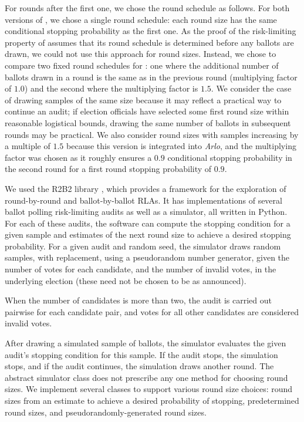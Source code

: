 For rounds after the first one, we chose the round schedule as follows. For both versions of \BRAVO, we chose a single round schedule: each round size has the same conditional stopping probability as the first one. As the proof of the risk-limiting property of \Minerva assumes that its round schedule is determined before any ballots are drawn, we could not use this approach for \Minerva round sizes. Instead, we chose to compare two fixed round schedules for \Minerva: one where the additional number of ballots drawn in a round is the same as in the previous round (multiplying factor of $1.0$) and the second where the multiplying factor is $1.5$. We consider the case of drawing samples of the same size because it may reflect a practical way to continue an
audit; if election officials have selected some first round size within
reasonable logistical bounds, drawing the same number of 
ballots in subsequent rounds may be practical.
We also consider round sizes with samples increasing by a multiple
of $1.5$ because this version is integrated into {\em Arlo}, and the multiplying factor was chosen as it roughly ensures a $0.9$ conditional stopping probability in the second round for a first round stopping probability of $0.9$. 

We used the R2B2 library \cite{r2b2_anon}, which provides a framework for the exploration of round-by-round
and ballot-by-ballot RLAs. It has implementations of several ballot polling risk-limiting audits as well as a simulator, 
all written in Python. For each of these audits, the software can compute the stopping condition for a given sample and estimates
of the next round size to achieve a desired stopping probability. 
For a given audit and random seed, the simulator draws random samples, with replacement, using a pseudorandom number generator, given the number of votes for each candidate, and the number of invalid votes, in the underlying election (these need not be chosen to be as announced). 

When the number of candidates is more than two, the audit is carried out pairwise for each candidate pair, and votes for all other candidates are considered invalid votes. 

After drawing a simulated sample of ballots, the simulator evaluates the given audit's stopping condition for this sample.
If the audit stops, the simulation stops, and if the audit continues, the simulation draws another round. 
The abstract simulator class does not prescribe any one method for choosing round sizes. 
We implement several classes to support various round size choices: 
round sizes from an estimate to achieve a desired probability of stopping, 
predetermined round sizes, and pseudorandomly-generated round sizes. 
